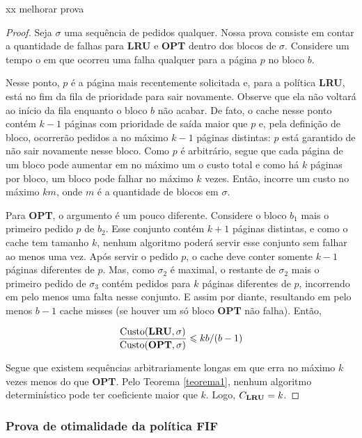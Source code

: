 xx melhorar prova
\begin{proof}
  Seja \(\sigma\) uma sequência de pedidos qualquer. Nossa prova consiste em contar a quantidade de falhas para \textbf{LRU} e \textbf{OPT} dentro dos blocos de \(\sigma\). Considere um tempo o em que ocorreu uma falha qualquer para a página \(p\) no bloco \(b\).

  Nesse ponto, \(p\) é a página mais recentemente solicitada e, para a política \textbf{LRU}, está no fim da fila de prioridade para sair novamente. Observe que ela não voltará ao início da fila enquanto o bloco \(b\) não acabar. De fato, o cache nesse ponto contém \(k-1\) páginas com prioridade de saída maior que \(p\) e, pela definição de bloco, ocorrerão pedidos a no máximo \(k-1\) páginas distintas: \(p\) está garantido de não sair novamente nesse bloco. Como \(p\) é arbitrário, segue que cada página de um bloco pode aumentar em no máximo um o custo total e como há \(k\) páginas por bloco, um bloco pode falhar no máximo \(k\) vezes. Então,  incorre um custo no máximo \(km\), onde \(m\) é a quantidade de blocos em \(\sigma\).

  Para \textbf{OPT}, o argumento é um pouco diferente. Considere o bloco \(b_1\) mais o primeiro pedido \(p\) de \(b_2\). Esse conjunto contém \(k+1\) páginas distintas, e como o cache tem tamanho \(k\), nenhum algoritmo poderá servir esse conjunto sem falhar ao menos uma vez. Após servir o pedido \(p\), o cache deve conter somente \(k-1\) páginas diferentes de \(p\). Mas, como \(\sigma_2\) é maximal, o restante de \(\sigma_2\) mais o primeiro pedido de \(\sigma_3\) contém pedidos para \(k\) páginas diferentes de \(p\), incorrendo em pelo menos uma falta nesse conjunto. E assim por diante, resultando em pelo menos \(b - 1\) cache misses (se houver um só bloco \textbf{OPT} não falha). Então, 

  \begin{equation*}
    \frac{\text{Custo}(\bold{LRU}, \sigma)}{\text{Custo}(\bold{OPT}, \sigma)} \leqslant kb/(b-1)
  \end{equation*}

  Segue que existem sequências arbitrariamente longas em que  erra no máximo \(k\) vezes menos do que \textbf{OPT}. Pelo Teorema \ref{teorema1}, nenhum algoritmo determinístico pode ter coeficiente maior que \(k\). Logo, \(C_{\bold{LRU}} = k\).
\end{proof}


\subsubsection{Prova de otimalidade da política \textbf{FIF}}

